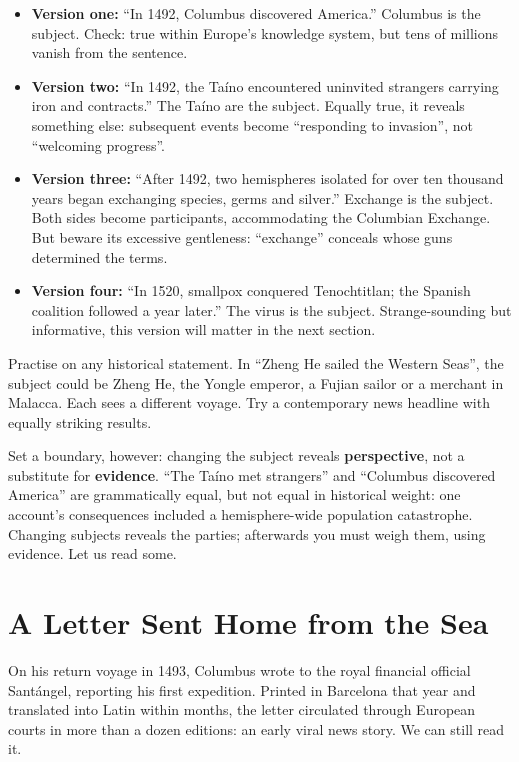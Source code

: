 \begin{itemize}
\item \textbf{Version one:} ``In 1492, Columbus discovered America.'' Columbus is the subject. Check: true within Europe's knowledge system, but tens of millions vanish from the sentence.
\item \textbf{Version two:} ``In 1492, the Taíno encountered uninvited strangers carrying iron and contracts.'' The Taíno are the subject. Equally true, it reveals something else: subsequent events become ``responding to invasion'', not ``welcoming progress''.
\item \textbf{Version three:} ``After 1492, two hemispheres isolated for over ten thousand years began exchanging species, germs and silver.'' Exchange is the subject. Both sides become participants, accommodating the Columbian Exchange. But beware its excessive gentleness: ``exchange'' conceals whose guns determined the terms.
\item \textbf{Version four:} ``In 1520, smallpox conquered Tenochtitlan; the Spanish coalition followed a year later.'' The virus is the subject. Strange-sounding but informative, this version will matter in the next section.
\end{itemize}
Practise on any historical statement. In ``Zheng He sailed the Western Seas'', the subject could be Zheng He, the Yongle emperor, a Fujian sailor or a merchant in Malacca. Each sees a different voyage. Try a contemporary news headline with equally striking results.

Set a boundary, however: changing the subject reveals \textbf{perspective}, not a substitute for \textbf{evidence}. ``The Taíno met strangers'' and ``Columbus discovered America'' are grammatically equal, but not equal in historical weight: one account's consequences included a hemisphere-wide population catastrophe. Changing subjects reveals the parties; afterwards you must weigh them, using evidence. Let us read some.

\section{A Letter Sent Home from the Sea}
On his return voyage in 1493, Columbus wrote to the royal financial official Santángel, reporting his first expedition. Printed in Barcelona that year and translated into Latin within months, the letter circulated through European courts in more than a dozen editions: an early viral news story. We can still read it.

